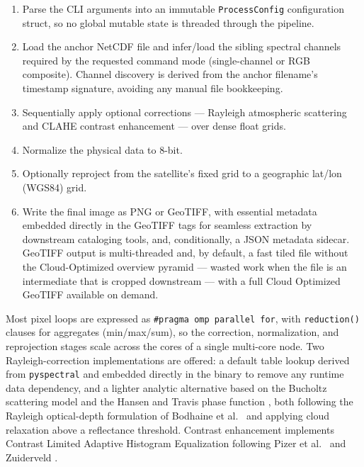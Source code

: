 \documentclass[preprint,12pt]{elsarticle}
\begin{document}
\begin{enumerate}
    \item Parse the CLI arguments into an immutable \texttt{ProcessConfig}
    configuration struct, so no global mutable state is threaded through the
    pipeline.
    \item Load the anchor NetCDF file and infer/load the sibling spectral
    channels required by the requested command mode (single-channel or RGB
    composite). Channel discovery is derived from the anchor filename's
    timestamp signature, avoiding any manual file bookkeeping.
    \item Sequentially apply optional corrections --- Rayleigh atmospheric
    scattering and CLAHE contrast enhancement --- over dense float grids.
    \item Normalize the physical data to 8-bit.
    \item Optionally reproject from the satellite's fixed grid to a geographic
    lat/lon (WGS84) grid.
    \item Write the final image as PNG or GeoTIFF, with essential metadata
    embedded directly in the GeoTIFF tags for seamless extraction by downstream
    cataloging tools, and, conditionally, a JSON metadata sidecar. GeoTIFF
    output is multi-threaded and, by default, a fast tiled file without the
    Cloud-Optimized overview pyramid --- wasted work when the file is an
    intermediate that is cropped downstream --- with a full Cloud Optimized
    GeoTIFF available on demand.
\end{enumerate}

Most pixel loops are expressed as \texttt{\#pragma omp parallel for}, with
\texttt{reduction()} clauses for aggregates (min/max/sum), so the correction,
normalization, and reprojection stages scale across the cores of a single
multi-core node. Two Rayleigh-correction implementations are offered: a default
table lookup derived from \texttt{pyspectral}
\cite{Scheirer2018,PySpectralLUT2018} and embedded directly in the binary to
remove any runtime data dependency, and a lighter analytic alternative based on
the Bucholtz scattering model and the Hansen and Travis phase function
\cite{Bucholtz1995,HansenTravis1974}, both following the Rayleigh
optical-depth formulation of Bodhaine et al.\ \cite{Bodhaine1999} and applying
cloud relaxation above a reflectance threshold. Contrast enhancement implements
Contrast Limited Adaptive Histogram Equalization following Pizer et al.\
\cite{Pizer1987} and Zuiderveld \cite{Zuiderveld1994}.
\end{document}
